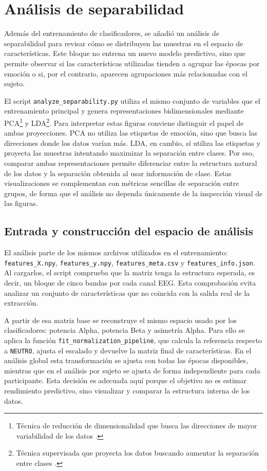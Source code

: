 \section{Análisis de separabilidad}

Además del entrenamiento de clasificadores, se añadió un análisis de separabilidad para revisar cómo se distribuyen las muestras en el espacio de características. Este bloque no entrena un nuevo modelo predictivo, sino que permite observar si las características utilizadas tienden a agrupar las épocas por emoción o si, por el contrario, aparecen agrupaciones más relacionadas con el sujeto.

El script \texttt{analyze\_separability.py} utiliza el mismo conjunto de variables que el entrenamiento principal y genera representaciones bidimensionales mediante \ac{PCA}\footnote{Técnica de reducción de dimensionalidad que busca las direcciones de mayor variabilidad de los datos \cite{wikipediaPCA}.} y \ac{LDA}\footnote{Técnica supervisada que proyecta los datos buscando aumentar la separación entre clases \cite{wikipediaLDA}.}. Para interpretar estas figuras conviene distinguir el papel de ambas proyecciones. \ac{PCA} no utiliza las etiquetas de emoción, sino que busca las direcciones donde los datos varían más. \ac{LDA}, en cambio, sí utiliza las etiquetas y proyecta las muestras intentando maximizar la separación entre clases. Por eso, comparar ambas representaciones permite diferenciar entre la estructura natural de los datos y la separación obtenida al usar información de clase. Estas visualizaciones se complementan con métricas sencillas de separación entre grupos, de forma que el análisis no dependa únicamente de la inspección visual de las figuras.

\subsection{Entrada y construcción del espacio de análisis}

El análisis parte de los mismos archivos utilizados en el entrenamiento: \texttt{features\_X.npy}, \texttt{features\_y.npy}, \texttt{features\_meta.csv} y \texttt{features\_info.json}. Al cargarlos, el script comprueba que la matriz tenga la estructura esperada, es decir, un bloque de cinco bandas por cada canal \ac{EEG}. Esta comprobación evita analizar un conjunto de características que no coincida con la salida real de la extracción.

A partir de esa matriz base se reconstruye el mismo espacio usado por los clasificadores: potencia Alpha, potencia Beta y asimetría Alpha. Para ello se aplica la función \texttt{fit\_normalization\_pipeline}, que calcula la referencia respecto a \texttt{NEUTRO}, ajusta el escalado y devuelve la matriz final de características. En el análisis global esta transformación se ajusta con todas las épocas disponibles, mientras que en el análisis por sujeto se ajusta de forma independiente para cada participante. Esta decisión es adecuada aquí porque el objetivo no es estimar rendimiento predictivo, sino visualizar y comparar la estructura interna de los datos.

